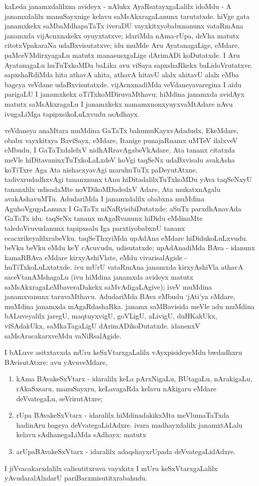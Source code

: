 kaLeda janamxdalilxna avideyx - nAlukx AyaRsatayxgaLalilx idoMdu - A janamxdalilx manuSayxnige kelavu saMsAkxragaLanunx tarutatxde. hiVge gata janamxkekx saMbaMdhapaTaTx iveraDU vayxkitxyobabxnanunx vataRmAna janamxda vijAcnxnakekx oyuyxtatxve; idariMda nAma-rUpa, deVha matutx citotxVpakaraNa udaBxvisutatxve; idu muMde Aru AyatanagaLige, eMdare, paMceVMdirxyagaLu matutx manasusxgaLige dArimADi koDutatxde. I Aru AyatanagaLu huTuTxkoMDa baLika avu viSaya sapxshaRkekx baLidoVrutatxve. sapxshaRdiMda hita athavA ahita, athavA hitavU alalx ahitavU alalx eMba bageya veVdane udaBxvisutatxde. vijAcnxnadiMda veVdaneyavaregina I aidu parigaLU I janamxkekx oTiTxkoMDiruvaMthavu; hiMdina janamxda avidAyx matutx saMsAkxragaLu I janamxkekx namamxnonxyuyxvaMtAdare nAvu ivugaLiMga tapipxsikoLuLxvudu asAdhayx.

veVdaneya anaMtara muMdina GaTaTx bahumuKayxvAdadudx, EkeMdare, obabx \hbox{vayxkitxya} BaviSayx, eMdare, Itanige punajaRnamx uMTeV ilalxveV eMbudu, I GaTaTxdalelxV nidhARra\-vAgabeVkAdare, Ata tananx citatxda meVle hiDitavaninxTuTxkoLaLxdeV hoVgi taqSeNx udaBxvisalu avakAsha koTiTxre Aga Ata nishacxyavAgi maruhuTuTx paDeyutAtxne. tadivxrudadhxvAgi \hbox{tananxnunx} tAnu hiDitadalilxTuTxkoMDu yAva taqSeNxyU tananxlilx udisadaMte noVDi\-koMDadedxV Adare, Ata mukatxnAgalu avakAshavuMTu. AdudariMda I janamxdalilx obabxna muMdina AguhoVgugaLanunx I GaTaTx niNaRyisibiDutatxde; aSuTx parxdhAnavAda GaTaTx idu. taqSeNx tananx mAgaRvanunx hiDidu eMdinaMte taledoVruvudanunx tapipxsalu Iga parxtiyobabxnU tananx ecacxrikeyalilxrabeVku. taqSeThxyiMda upAdAna eMdare hiDidukoLuLxvudu. beVku beVku eMdu keY cAcuvudu, udisutatxde; upAdAnadiMda BAva - idanunx kamaR\-BAva eMdare kirxyAshiVlate, eMdu vivarisalAgide - huTiTxkoLuLxtatxde. ivu mUrU vataRmAna janamxda kirxyAshiVla athavA saceVtanAMshagaLu (ivu hiMdina janamxda avideyx matutx saMsAkxragaLeMbaveraDakekx saMvAdigaLAgive); iveV muMdina janamxvanunx taruvaMthavu. AdudariMda BAva eMbudu `jAti'ya eMdare, muMdina janamxda mAgaRdashaRka. janamx saMBavisida meVle adu muMdina bALuveyalilx jaregU, maqtuyxvigU, \hbox{goVLigU}, aLivigU, duHKakUkx, viSAdakUkx, saMkaTagaLigU dArimADikoDutatxde. idanenxV saMsAra\-cakarxveMdu vaNiRsalAgide.

I bALuve asitxtavxda mUru keSxVtarxgaLalilx vAyxpisideyeMdu bwdadhxru BAvisutAtxre: avu yAvuveMdare, 
\begin{enumerate}
\renewcommand{\theenumi}{\arabic{enumi}}
\renewcommand{\labelenumi}{(\theenumi)}
\itemsep=0pt
\item kAma BAvakeSxVtarx - idaralilx keLa pArxNigaLu, BUtagaLu, nArakigaLu, rAkaSxsaru, manuSayxru, keLavagaRda kelavu nAkigaru eMdare deVvategaLu, seVrirutAtxre;
\item rUpa BAvakeSxVtarx - idaralilx hiMdinadakikxMta meVlumaTaTxda hadinAru bageya deVvategaLidAdxre. ivara madhayxdalilx janamxtALalu kelavu sAdhanegaLiMda sAdhayx: matutx 
\item arUpaBAvakeSxVtarx - idaralilx adaqshayxrUpada deVvategaLidAdxre.
\end{enumerate}
I jiVvacakarxdalilx calisutitxruva vayxkitx I mUru keSxVtarxgaLalilx yAvudaralAlxdarU pariBarxmisutitxrabahudu.

